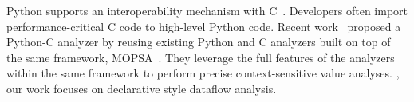 Python supports an interoperability mechanism with C~\cite{PythonC}.
Developers often import performance-critical C code to high-level Python code.
Recent work~\cite{sas2021} proposed a Python-C analyzer by reusing existing
Python and C analyzers built on top of the same framework, MOPSA~\cite{Mopsa}.
They leverage the full features of the analyzers within the same framework to
perform precise context-sensitive value analyses. 
, our work focuses on declarative style dataflow analysis. 
